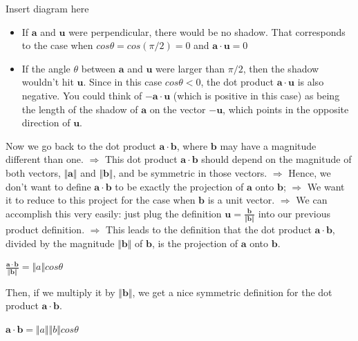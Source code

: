\documentclass{report}
\begin{document}
Insert diagram here\newline\newline

\begin{itemize}
	\item If $\bm{a}$ and $\bm{u}$ were perpendicular, there would be no shadow. That corresponds to the case when $cos \theta = cos (\pi / 2) = 0$ and $\bm{a} \cdot \bm{u} = 0$
    \item If the angle $\theta$ between $\bm{a}$ and $\bm{u}$ were larger than $\pi / 2$, then the shadow wouldn't hit $\bm{u}$. Since in this case $cos \theta < 0$, the dot product $\bm{a} \cdot \bm{u}$ is also negative. You could think of $-\bm{a} \cdot \bm{u}$ (which is positive in this case) as being the length of the shadow of $\bm{a}$ on the vector $-\bm{u}$, which points in the opposite direction of $\bm{u}$.
\end{itemize}

Now we go back to the dot product $\bm{a} \cdot \bm{b}$, where $\bm{b}$ may have a magnitude different than one. 
$\Rightarrow$ This dot product $\bm{a} \cdot \bm{b}$ should depend on the magnitude of both vectors, $\Vert \bm{a} \Vert$ and $\Vert \bm{b} \Vert$, and be symmetric in those vectors.\newline
$\Rightarrow$ Hence, we don't want to define $\bm{a} \cdot \bm{b}$ to be exactly the projection of $\bm{a}$ onto $\bm{b}$;\newline
$\Rightarrow$ We want it to reduce to this project for the case when $\bm{b}$ is a unit vector.\newline
$\Rightarrow$ We can accomplish this very easily: just plug the definition $\bm{u} = \frac{\bm{b}}{\Vert \bm{b} \Vert}$ into our previous product definition.\newline
$\Rightarrow$ This leads to the definition that the dot product $\bm{a} \cdot \bm{b}$, divided by the magnitude $\Vert \bm{b} \Vert$ of $\bm{b}$, is the projection of $\bm{a}$ onto $\bm{b}$.\newline
	\centerline{$\frac{\bm{a} \cdot \bm{b}}{\Vert \bm{b} \Vert} = \Vert a \Vert cos \theta$}\newline\newline

Then, if we multiply it by $\Vert \bm{b} \Vert$, we get a nice symmetric definition for the dot product $\bm{a} \cdot \bm{b}$.\newline\newline
	\centerline{$\bm{a} \cdot \bm{b} = \Vert a \Vert \Vert b \Vert cos \theta$}\newline\newline
\end{document}

